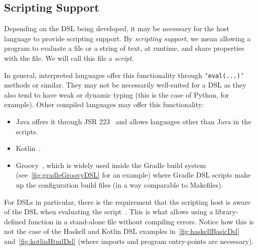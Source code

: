 \subsection{Scripting Support}\label{subsec:scripting-support}

Depending on the DSL being developed, it may be necessary for the host language to provide scripting support.
By \emph{scripting support}, we mean allowing a program to evaluate a file or a string of text, at runtime, and share properties with the file.
We will call this file a \emph{script}.

In general, interpreted languages offer this functionality through \texttt{`eval(...)'} methods or similar.
They may not be necessarily well-suited for a DSL as they also tend to have weak or dynamic typing (this is the case of Python, for example).
Other compiled languages may offer this functionality:
\begin{itemize}
    \item Java offers it through JSR 223~\cite{javaScripting} and allows languages other than Java in the scripts.
    \item Kotlin~\cite{kotlinScriptKeep}.
    \item Groovy~\cite{groovyScripting}, which is widely used inside the Gradle build system (see~\autoref{fig:gradleGroovyDSL} for an example) where Gradle DSL scripts make up the configuration build files (in a way comparable to Makefiles).
\end{itemize}

For DSLs in particular, there is the requirement that the scripting host is aware of the DSL when evaluating the script~\cite{kotlinScriptKeep}.
This is what allows using a library-defined function in a stand-alone file without compiling errors.
Notice how this is not the case of the Haskell and Kotlin DSL examples in~\autoref{fig:haskellBasicDsl} and~\autoref{fig:kotlinHtmlDsl} (where imports and program entry-points are necessary).

